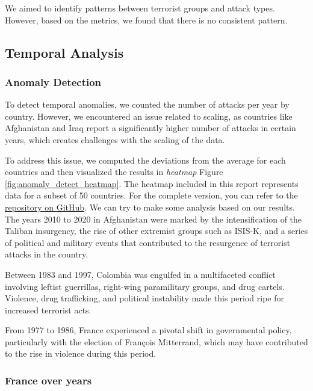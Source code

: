 \documentclass{article}
\begin{document}
We aimed to identify patterns between terrorist groups and attack types. However, based on the metrics, we found that there is no consistent pattern.

\subsection{Temporal Analysis}

\subsubsection{Anomaly Detection}

To detect temporal anomalies, we counted the number of attacks per year by country. However, we encountered an issue related to scaling, as countries like Afghanistan and Iraq report a significantly higher number of attacks in certain years, which creates challenges with the scaling of the data.

To address this issue, we computed the deviations from the average for each countries and then visualized the results in \textit{heatmap} Figure \ref{fig:anomaly_detect_heatmap}. The heatmap included in this report represents data for a subset of 50 countries. For the complete version, you can refer to the \href{https://github.com/ekomlenovic/SecurityDataset/blob/main/data_processing/analyses/anomaly_detect_heatmap_full.png}{repository on GitHub}.
We can try to make some analysis based on our results.\\
The years 2010 to 2020 in Afghanistan were marked by the intensification of the Taliban insurgency, the rise of other extremist groups such as ISIS-K, and a series of political and military events that contributed to the resurgence of terrorist attacks in the country.\cite{WikipediaAfghanistan}

Between 1983 and 1997, Colombia was engulfed in a multifaceted conflict involving leftist guerrillas, right-wing paramilitary groups, and drug cartels. Violence, drug trafficking, and political instability made this period ripe for increased terrorist acts.\cite{WikipediaColombia}

From 1977 to 1986, France experienced a pivotal shift in governmental policy, particularly with the election of François Mitterrand, which may have contributed to the rise in violence during this period.\cite{WikipediaMitterrand}

\subsubsection{France over years}
\end{document}
